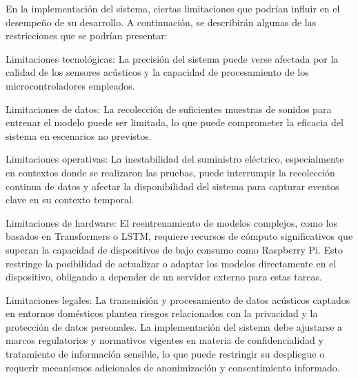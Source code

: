 
En la implementación del sistema, ciertas limitaciones que podrían influir en el desempeño de su desarrollo. A continuación, se describirán algunas de las restricciones que se podrían presentar:

Limitaciones tecnológicas: La precisión del sistema puede verse afectada por la calidad de los sensores acústicos y la capacidad de procesamiento de los microcontroladores empleados.

Limitaciones de datos: La recolección de suficientes muestras de sonidos para entrenar el modelo puede ser limitada, lo que puede comprometer la eficacia del sistema en escenarios no previstos.

Limitaciones operativas: La inestabilidad del suministro eléctrico, especialmente en contextos donde se realizaron las pruebas, puede interrumpir la recolección continua de datos y afectar la disponibilidad del sistema para capturar eventos clave en su contexto temporal.

Limitaciones de hardware: El reentrenamiento de modelos complejos, como los basados en Transformers o LSTM, requiere recursos de cómputo significativos que superan la capacidad de dispositivos de bajo consumo como Raspberry Pi. Esto restringe la posibilidad de actualizar o adaptar los modelos directamente en el dispositivo, obligando a depender de un servidor externo para estas tareas.

Limitaciones legales: La transmisión y procesamiento de datos acústicos captados en entornos domésticos plantea riesgos relacionados con la privacidad y la protección de datos personales. La implementación del sistema debe ajustarse a marcos regulatorios y normativos vigentes en materia de confidencialidad y tratamiento de información sensible, lo que puede restringir su despliegue o requerir mecanismos adicionales de anonimización y consentimiento informado.
